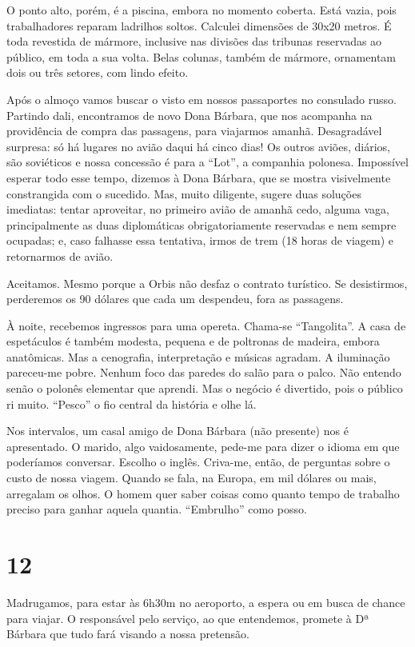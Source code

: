O ponto alto, porém, é a piscina, embora no momento coberta. Está vazia, pois trabalhadores reparam ladrilhos soltos. Calculei dimensões de 30x20 metros. É toda revestida de mármore, inclusive nas divisões das tribunas reservadas ao público, em toda a sua volta. Belas colunas, também de mármore, ornamentam dois ou três setores, com lindo efeito.

Após o almoço vamos buscar o visto em nossos passaportes no consulado russo. Partindo dali, encontramos de novo Dona Bárbara, que nos acompanha na providência de compra das passagens, para viajarmos amanhã. Desagradável surpresa: só há lugares no avião daqui há cinco dias! Os outros aviões, diários, são soviéticos e nossa concessão é para a ``Lot'', a companhia polonesa. Impossível esperar todo esse tempo, dizemos à Dona Bárbara, que se mostra visivelmente constrangida com o sucedido. Mas, muito diligente, sugere duas soluções imediatas: tentar aproveitar, no primeiro avião de amanhã cedo, alguma vaga, principalmente as duas diplomáticas obrigatoriamente reservadas e nem sempre ocupadas; e, caso falhasse essa tentativa, irmos de trem (18 horas de viagem) e retornarmos de avião.

Aceitamos. Mesmo porque a Orbis não desfaz o contrato turístico. Se desistirmos, perderemos os 90 dólares que cada um despendeu, fora as passagens.

À noite, recebemos ingressos para uma opereta. Chama-se ``Tangolita''. A casa de espetáculos é também modesta, pequena e de poltronas de madeira, embora anatômicas. Mas a cenografia, interpretação e músicas agradam. A iluminação pareceu-me pobre. Nenhum foco das paredes do salão para o palco. Não entendo senão o polonês elementar que aprendi. Mas o negócio é divertido, pois o público ri muito. ``Pesco'' o fio central da história e olhe lá.

Nos intervalos, um casal amigo de Dona Bárbara (não presente) nos é apresentado. O marido, algo vaidosamente, pede-me para dizer o idioma em que poderíamos conversar. Escolho o inglês. Criva-me, então, de perguntas sobre o custo de nossa viagem. Quando se fala, na Europa, em mil dólares ou mais, arregalam os olhos. O homem quer saber coisas como quanto tempo de trabalho preciso para ganhar aquela quantia. ``Embrulho'' como posso.

\section*{12 \adfflatleafright {}}
Madrugamos, para estar às 6h30m no aeroporto, a espera ou em busca de chance para viajar. O responsável pelo serviço, ao que entendemos, promete à Dª Bárbara que tudo fará visando a nossa pretensão.

